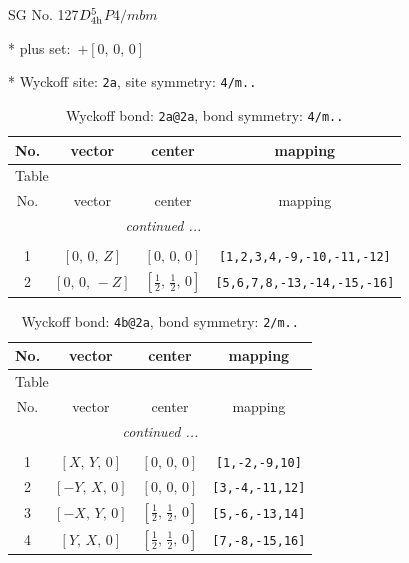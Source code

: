 \documentclass[fleqn,8pt]{jsarticle}
\begin{document}
\setcounter{MaxMatrixCols}{32}

\renewcommand{\tablename}{Table~}
\renewcommand{\figurename}{Figure~}
\begin{center}
\LARGE
SG No. 127\quad$D_{\rm 4h}^{5}$\quad$P4/mbm$\quad[ tetragonal ]
\end{center}

* plus set:\,\,\,$+\left[ 0,\, 0,\, 0 \right]$


* Wyckoff site: {\tt 2a}, site symmetry: {\tt 4/m..}
\renewcommand{\arraystretch}{1.2}
\begin{longtable}{cccc}
\caption{Wyckoff bond: {\tt 2a@2a}, bond symmetry: {\tt 4/m..}}
 \\
 \hline \hline
No. & vector & center & mapping \\ \hline \endfirsthead

\multicolumn{3}{l}{\tablename\ \thetable{}} \\
 \hline \hline
No. & vector & center & mapping \\ \hline \endhead

 \hline \hline
\multicolumn{3}{r}{\footnotesize\it continued ...} \\ \endfoot

 \hline \hline
\multicolumn{3}{r}{} \\ \endlastfoot

1 & $\left[ 0,\, 0,\, Z \right]$ & $\left[ 0,\, 0,\, 0 \right]$ & {\tt [1,2,3,4,-9,-10,-11,-12]} \\ \hline
2 & $\left[ 0,\, 0,\, - Z \right]$ & $\left[ \frac{1}{2},\, \frac{1}{2},\, 0 \right]$ & {\tt [5,6,7,8,-13,-14,-15,-16]} \\
\end{longtable}
\renewcommand{\arraystretch}{1.2}
\begin{longtable}{cccc}
\caption{Wyckoff bond: {\tt 4b@2a}, bond symmetry: {\tt 2/m..}}
 \\
 \hline \hline
No. & vector & center & mapping \\ \hline \endfirsthead

\multicolumn{3}{l}{\tablename\ \thetable{}} \\
 \hline \hline
No. & vector & center & mapping \\ \hline \endhead

 \hline \hline
\multicolumn{3}{r}{\footnotesize\it continued ...} \\ \endfoot

 \hline \hline
\multicolumn{3}{r}{} \\ \endlastfoot

1 & $\left[ X,\, Y,\, 0 \right]$ & $\left[ 0,\, 0,\, 0 \right]$ & {\tt [1,-2,-9,10]} \\ \hline
2 & $\left[ - Y,\, X,\, 0 \right]$ & $\left[ 0,\, 0,\, 0 \right]$ & {\tt [3,-4,-11,12]} \\ \hline
3 & $\left[ - X,\, Y,\, 0 \right]$ & $\left[ \frac{1}{2},\, \frac{1}{2},\, 0 \right]$ & {\tt [5,-6,-13,14]} \\ \hline
4 & $\left[ Y,\, X,\, 0 \right]$ & $\left[ \frac{1}{2},\, \frac{1}{2},\, 0 \right]$ & {\tt [7,-8,-15,16]} \\
\end{longtable}
\end{document}
